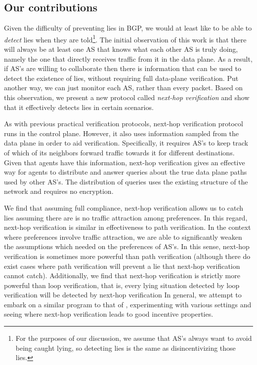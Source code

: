 \documentclass[pdftex,twoside,twocolumn,10pt,letterpaper]{article}
\begin{document}
  \subsection{Our contributions}
    Given the difficulty of preventing lies in BGP,
    we would at least like to be able to \emph{detect} lies when they are 
    told\footnote{
      For the purposes of our discussion, we assume that AS's always want 
      to avoid being caught lying, so detecting lies is the same as
      disincentivizing those lies.
    }.
    The initial observation of this work is that
    there will always be at least one AS that knows what each
    other AS is truly doing, namely the one that directly receives traffic from
    it in the data plane.
    As a result, if AS's are willing to collaborate then there is
    information that can be used to detect the existence of lies, without
    requiring full data-plane verification. Put another way, we can just monitor
    each AS, rather than every packet.
    Based on this observation, we present a new protocol called
    \emph{next-hop verification}
    and show that it effectively detects lies in certain scenarios.

    As with previous practical verification protocols,
    next-hop verification protocol runs in the control plane.
    However, it also uses
    information sampled from the data plane in order to aid verification.
    Specifically, it requires AS's to keep track of which of its neighbors
    forward traffic towards it for different destinations.
    Given that agents have this information, next-hop verification gives an
    effective way for agents to distribute and answer queries
    about the true data plane paths used by other AS's.
    The distribution of queries uses the existing structure
    of the network and requires no encryption.

    We find that assuming full compliance, next-hop verification allows us to catch lies assuming
    there are is no traffic attraction among preferences.
    In this regard, next-hop verification is similar in effectiveness to 
    path verification.
    In the context where preferences involve traffic attraction,
    we are able to significantly weaken the assumptions which
    \cite{Attraction} needed on the preferences of AS's.
    In this sense, next-hop verification is sometimes more powerful
    than path verification (although there do exist cases where
    path verification will prevent a lie that next-hop verification cannot catch).
    Additionally, we find that next-hop verification is strictly more
    powerful than loop verification, that is, every lying situation detected
    by loop verification will be detected by next-hop verification
    In general, we attempt to embark on a similar program to that of
    \cite{Attraction}, experimenting with various settings and seeing
    where next-hop verification leads to good incentive properties.
\end{document}
